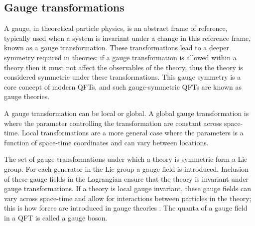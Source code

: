 \subsection{Gauge transformations}

A gauge, in theoretical particle physics, is an abstract frame of reference,
typically used when a system is invariant under a change in this reference
frame, known as a gauge transformation. These transformations lead to a deeper
symmetry required in theories: if a gauge transformation is allowed within a
theory then it must not affect the observables of the theory, thus the theory is
considered symmetric under these transformations.  This gauge symmetry is a core
concept of modern \acp{QFT}, and such gauge-symmetric \acp{QFT} are known as
gauge theories.

A gauge transformation can be local or global. A global gauge transformation is
where the parameter controlling the transformation are constant across
space-time. Local transformations are a more general case where the parameters is
a function of space-time coordinates and can vary between locations.

The set of gauge transformations under which a theory is symmetric form a Lie
group. For each generator in the Lie group a gauge field is introduced.
Inclusion of these gauge fields in the Lagrangian ensure that the theory is
invariant under gauge transformations. If a theory is local gauge invariant,
these gauge fields can vary across space-time and allow for interactions between
particles in the theory; this is how forces are introduced in gauge theories
\cite[pp.242-3]{Thomson2013}.  The quanta of a gauge field in a \ac{QFT} is
called a gauge boson.
